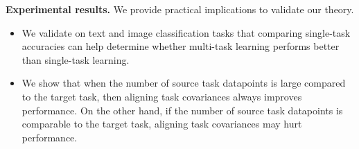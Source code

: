 



\textbf{Experimental results.} We provide practical implications to validate our theory.
\begin{itemize}
	\item We validate on text and image classification tasks that comparing single-task accuracies can help determine whether multi-task learning performs better than single-task learning.
	\item We show that when the number of source task datapoints is large compared to the target task, then aligning task covariances always improves performance.
	On the other hand, if the number of source task datapoints is comparable to the target task, aligning task covariances may hurt performance.
\end{itemize}

